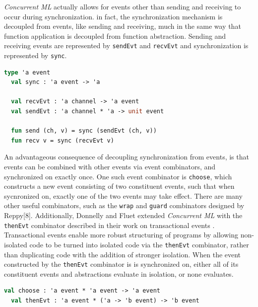 \documentclass[10pt]{article}
\begin{document}
\textit{Concurrent ML} actually allows for events other than sending and receiving to
occur during synchronization. in fact, the synchronization mechanism is decoupled from
events, like sending and receiving, much in the same way that function application is decoupled
from function abstraction. Sending and receiving events are represented by \lstinline{sendEvt}
and \lstinline{recvEvt} and synchronization is represented by \lstinline{sync}.

\begin{lstlisting}[language=ML, mathescape]
  type 'a event
  val sync : 'a event -> 'a

  val recvEvt : 'a channel -> 'a event
  val sendEvt : 'a channel * 'a -> unit event

  fun send (ch, v) = sync (sendEvt (ch, v))
  fun recv v = sync (recvEvt v)
\end{lstlisting}

An advantageous consequence of decoupling synchronization from events, is that events can be
combined with other events via event combinators, and synchronized on exactly once. One such
event combinator is \lstinline{choose}, which constructs a new event consisting of two
constituent events, such that when sycnronized on, exactly one of the two events may take
effect. There are many other useful combinators, such as the \lstinline{wrap} and
\lstinline{guard} combinators designed by Reppy[8]. Additionally, Donnelly and Fluet extended
\textit{Concurrent ML} with the \lstinline{thenEvt} combinator described in their work on
transactional events \cite{transactional_events}. Transactional events enable more robust
structuring of programs by allowing non-isolated code to be turned into isolated code via
the \lstinline{thenEvt} combinator, rather than duplicating code with the addition of stronger
isolation. When the event constructed by the \lstinline{thenEvt} combinator is is synchronized
on, either all of its constituent events and abstractions evaluate in isolation, or none
evaluates.

\begin{lstlisting}[language=ML, mathescape]
  val choose : 'a event * 'a event -> 'a event
  val thenEvt : 'a event * ('a -> 'b event) -> 'b event
  \end{lstlisting}
\end{document}
